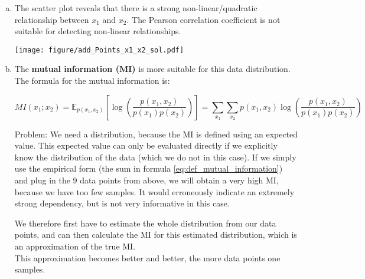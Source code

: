 {\begin{enumerate}[a)]
  \item  The scatter plot reveals that there is a strong non-linear/quadratic relationship between $x_1$ and $x_2$. The Pearson correlation coefficient is not suitable for detecting non-linear relationships.
  
	\begin{center}
	\texttt{[image: figure/add\_Points\_x1\_x2\_sol.pdf]}
	\end{center}



  \item The \textbf{mutual information (MI)} is more suitable for this data distribution. The formula for the mutual information is:
  
  \begin{equation}\label{eq:def_mutual_information}
  	MI(x_1 ; x_2 ) =  \mathbb{E}_{p(x_1, x_2)} \left[ \log\left(\frac{p(x_1, x_2)}{p(x_1) p(x_2)} \right) \right] = \sum_{x_1} \sum_{x_2} p(x_1, x_2) \log\left(\frac{p(x_1, x_2)}{p(x_1) p(x_2)} \right)
  \end{equation}
  
  Problem: We need a distribution, because the MI is defined using an expected value.
  This expected value can only be evaluated directly if we explicitly know the distribution of the data (which we do not in this case).
  If we simply use the empirical form (the sum in formula \eqref{eq:def_mutual_information}) and plug in the 9 data points from above, we will obtain a very high MI, because we have too few samples. It would erroneously indicate an extremely strong dependency, but is not very informative in this case.
  
  We therefore first have to estimate the whole distribution from our data points, and can then calculate the MI for this estimated distribution, which is an approximation of the true MI. \\
  This approximation becomes better and better, the more data points one samples.
  
\end{enumerate}
}

